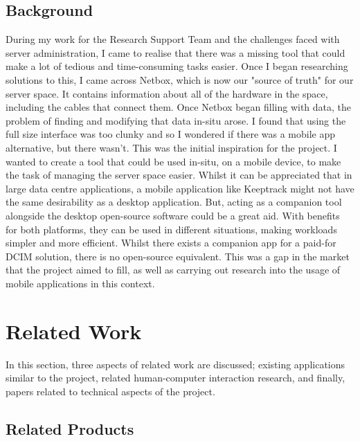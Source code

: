 \documentclass [11pt,a4paper]{article}
\begin{document}
\subsection{Background}
\label{sec:background}
During my work for the Research Support Team and the challenges faced with server administration, I came to realise that there was a missing tool that could make a lot of tedious and time-consuming tasks easier. Once I began researching solutions to this, I came across Netbox, which is now our "source of truth" for our server space. It contains information about all of the hardware in the space, including the cables that connect them. Once Netbox began filling with data, the problem of finding and modifying that data in-situ arose. I found that using the full size interface was too clunky and so I wondered if there was a mobile app alternative, but there wasn't. This was the initial inspiration for the project. I wanted to create a tool that could be used in-situ, on a mobile device, to make the task of managing the server space easier. Whilst it can be appreciated that in large data centre applications, a mobile application like Keeptrack might not have the same desirability as a desktop application. But, acting as a companion tool alongside the desktop open-source software could be a great aid. With benefits for both platforms, they can be used in different situations, making workloads simpler and more efficient. Whilst there exists a companion app for a paid-for DCIM solution, there is no open-source equivalent. This was a gap in the market that the project aimed to fill, as well as carrying out research into the usage of mobile applications in this context.

\pagebreak

\section{Related Work}

In this section, three aspects of related work are discussed; existing applications similar to the project, related human-computer interaction research, and finally, papers related to technical aspects of the project.

\subsection{Related Products}
\label{sec:app_reviews}
\end{document}
